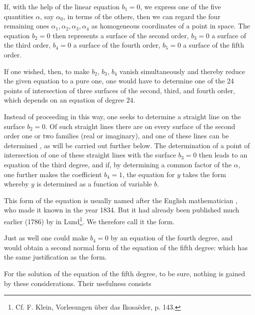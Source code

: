 
If, with the help of the linear equation $b_1 = 0$, we
express one of the five quantities $\alpha$, say $\alpha_0$, in terms of the others, then we can regard the four remaining ones $\alpha_1, \alpha_2, \alpha_3, \alpha_4$ as homogeneous coordinates of a point in space. The equation
$b_2 = 0$ then represents a surface of the second order, $b_3 = 0$
a surface of the third order, $b_4 = 0$ a surface of the fourth order, $b_5 = 0$ a surface of the fifth order.

If one wished, then, to make $b_2$, $b_3$, $b_4$ vanish simultaneously and
thereby reduce the given equation to a pure one, one
would have to determine one of the 24 points of intersection of three surfaces
of the second, third, and fourth order, which depends on an equation of degree $24$.

Instead of proceeding in this way, one seeks to determine a straight line on the surface
$b_2 = 0$. Of such straight lines
there are on every surface of the second order one or two
families (real or imaginary), and one of these lines can be determined
, as will be carried out further below. The determination of a point of intersection of one
of these straight lines with the surface $b_3 = 0$ then leads to
an equation of the third degree, and if, by determining a common factor of the $\alpha$, one further makes the coefficient
$b_4 = 1$, the equation for $y$ takes the form
whereby $y$ is determined as a function of  variable $b$.

This form of the equation is usually named after the English
mathematician , who made it known in the year 1834.
But it had already been published much earlier (1786) by 
in Lund\footnote{Cf. F. Klein, Vorlesungen über das Ikosaëder, p. 143.}. We therefore call it the  form.

Just as well one could make $b_4 = 0$ by an equation of the fourth degree,
and would obtain a second normal form of the equation
of the fifth degree:
which has the same justification as the 
form.

For the solution of the equation of the fifth degree, to be sure, nothing
is gained by these considerations. Their usefulness consists
